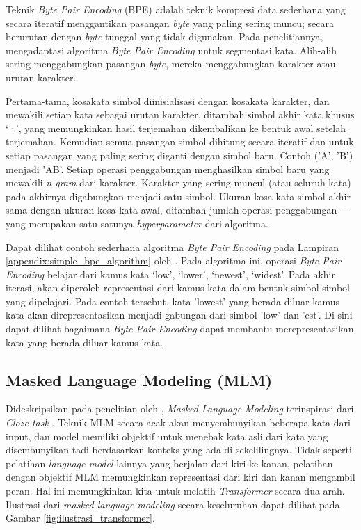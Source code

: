     Teknik \textit{Byte Pair Encoding} (BPE) \parencite{GageBPE1994} adalah teknik kompresi data sederhana yang secara iteratif menggantikan pasangan \textit{byte} yang paling sering muncu; secara berurutan dengan \textit{byte} tunggal yang tidak digunakan. Pada penelitiannya, \parencite{Sennrich_Haddow_Birch_2016} mengadaptasi algoritma \textit{Byte Pair Encoding} untuk segmentasi kata. Alih-alih sering menggabungkan pasangan \textit{byte}, mereka menggabungkan karakter atau urutan karakter.

    Pertama-tama, kosakata simbol diinisialisasi dengan kosakata karakter, dan mewakili setiap kata sebagai urutan karakter, ditambah simbol akhir kata khusus ‘·’, yang memungkinkan hasil terjemahan dikembalikan ke bentuk awal setelah terjemahan. Kemudian semua pasangan simbol dihitung secara iteratif dan untuk setiap pasangan yang paling sering diganti dengan simbol baru. Contoh ('A', 'B') menjadi 'AB'. Setiap operasi penggabungan menghasilkan simbol baru yang mewakili \textit{n-gram} dari karakter. Karakter yang sering muncul (atau seluruh kata) pada akhirnya digabungkan menjadi satu simbol. Ukuran kosa kata simbol akhir sama dengan ukuran kosa kata awal, ditambah jumlah operasi penggabungan --- yang merupakan satu-satunya \textit{hyperparameter} dari algoritma.

    Dapat dilihat contoh sederhana algoritma \textit{Byte Pair Encoding} pada Lampiran \ref{appendix:simple_bpe_algorithm} oleh \parencite{Sennrich_Haddow_Birch_2016}. Pada algoritma ini, operasi \textit{Byte Pair Encoding} belajar dari kamus kata {‘low’, ‘lower’, ‘newest’, ‘widest’}. Pada akhir iterasi, akan diperoleh representasi dari kamus kata dalam bentuk simbol-simbol yang dipelajari. Pada contoh tersebut, kata 'lowest' yang berada diluar kamus kata akan direpresentasikan menjadi gabungan dari simbol 'low' dan 'est'. Di sini dapat dilihat bagaimana \textit{Byte Pair Encoding} dapat membantu merepresentasikan kata yang berada diluar kamus kata. 

    \subsection{Masked Language Modeling (MLM)}
    Dideskripsikan pada penelitian oleh \parencite{Devlin_Chang_Lee_Toutanova_2019}, \textit{Masked Language Modeling} terinspirasi dari \textit{Cloze task} \parencite{Taylor_1953}. Teknik MLM secara acak akan menyembunyikan beberapa kata dari input, dan model memiliki objektif untuk menebak kata asli dari kata yang disembunyikan tadi berdasarkan konteks yang ada di sekelilingnya. Tidak seperti pelatihan \textit{language model} lainnya yang berjalan dari kiri-ke-kanan, pelatihan dengan objektif MLM memungkinkan representasi dari kiri dan kanan mengambil peran. Hal ini memungkinkan kita untuk melatih \textit{Transformer} secara dua arah. Ilustrasi dari \textit{masked language modeling} secara keseluruhan dapat dilihat pada Gambar \ref{fig:ilustrasi_transformer}.

